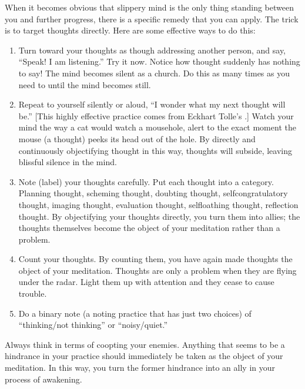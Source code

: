 \documentclass[a5paper,10pt,english]{book}
\begin{document}
\sphinxAtStartPar
When it becomes obvious that slippery mind is the only thing standing
between you and further progress, there is a specific remedy that you
can apply. The trick is to target thoughts directly. Here are some
effective ways to do this:
\begin{enumerate}
%
\item {} 
\sphinxAtStartPar
Turn toward your thoughts as though addressing another person, and
say, “Speak! I am listening.” Try it now. Notice how thought suddenly
has nothing to say! The mind becomes silent as a church. Do this as
many times as you need to until the mind becomes still.

\item {} 
\sphinxAtStartPar
Repeat to yourself silently or aloud, “I wonder what my next thought
will be.” {[}This highly effective practice comes from Eckhart Tolle’s
.{]} Watch your mind the way a cat would watch a
mousehole, alert to the exact moment the mouse (a thought) peeks its
head out of the hole. By directly and continuously objectifying
thought in this way, thoughts will subside, leaving blissful silence
in the mind.

\item {} 
\sphinxAtStartPar
Note (label) your thoughts carefully. Put each thought into a
category. Planning thought, scheming thought, doubting thought,
self\sphinxhyphen{}congratulatory thought, imaging thought, evaluation thought,
self\sphinxhyphen{}loathing thought, reflection thought. By objectifying your
thoughts directly, you turn them into allies; the thoughts themselves
become the object of your meditation rather than a problem.

\item {} 
\sphinxAtStartPar
Count your thoughts. By counting them, you have again made thoughts
the object of your meditation. Thoughts are only a problem when they
are flying under the radar. Light them up with attention and they
cease to cause trouble.

\item {} 
\sphinxAtStartPar
Do a binary note (a noting practice that has just two choices) of
“thinking/not thinking” or “noisy/quiet.”

\end{enumerate}

\sphinxAtStartPar
Always think in terms of co\sphinxhyphen{}opting your enemies. Anything that seems to
be a hindrance in your practice should immediately be taken as the
object of your meditation. In this way, you turn the former hindrance
into an ally in your process of awakening.
\end{document}
